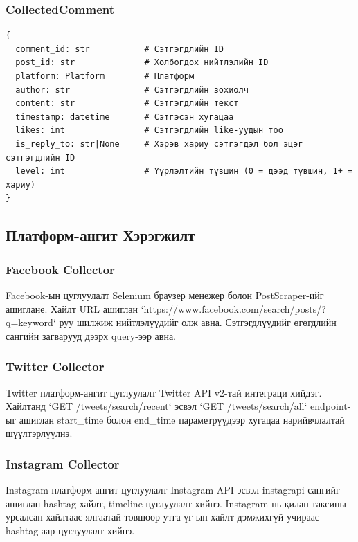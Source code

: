 \documentclass[12pt,a4paper]{report}
\begin{document}
\subsubsection{CollectedComment}

\begin{verbatim}
{
  comment_id: str           # Сэтгэгдлийн ID
  post_id: str              # Холбогдох нийтлэлийн ID
  platform: Platform        # Платформ
  author: str               # Сэтгэгдлийн зохиолч
  content: str              # Сэтгэгдлийн текст
  timestamp: datetime       # Сэтгэсэн хугацаа
  likes: int                # Сэтгэгдлийн like-уудын тоо
  is_reply_to: str|None     # Хэрэв хариу сэтгэгдэл бол эцэг сэтгэгдлийн ID
  level: int                # Үүрлэлтийн түвшин (0 = дээд түвшин, 1+ = хариу)
}
\end{verbatim}

\subsection{Платформ-ангит Хэрэгжилт}

\subsubsection{Facebook Collector}

Facebook-ын цуглуулалт Selenium браузер менежер болон PostScraper-ийг ашиглане. Хайлт URL ашиглан `https://www.facebook.com/search/posts/?q={keyword}` руу шилжиж нийтлэлүүдийг олж авна. Сэтгэгдлүүдийг өгөгдлийн сангийн загварууд дээрх query-ээр авна.

\subsubsection{Twitter Collector}

Twitter платформ-ангит цуглуулалт Twitter API v2-тай интеграци хийдэг. Хайлтанд `GET /tweets/search/recent` эсвэл `GET /tweets/search/all` endpoint-ыг ашиглан start\_time болон end\_time параметрүүдээр хугацаа нарийвчлалтай шүүлтэрлүүлнэ.

\subsubsection{Instagram Collector}

Instagram платформ-ангит цуглуулалт Instagram API эсвэл instagrapi сангийг ашиглан hashtag хайлт, timeline цуглуулалт хийнэ. Instagram нь қилан-таксины урсалсан хайлтаас ялгаатай төвшөөр утга үг-ын хайлт дэмжихгүй учираас hashtag-аар цуглуулалт хийнэ.
\end{document}
